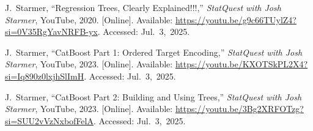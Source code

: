 \documentclass[12pt,oneside]{report}
\begin{document}
\begin{enumerate}[label={[\arabic*]}]

\item J.~Starmer, ``Regression Trees, Clearly Explained!!!,'' \textit{StatQuest with Josh Starmer}, YouTube, 2020. [Online]. Available: \url{https://youtu.be/g9c66TUylZ4?si=0V35RgYavNRFB-yx}. Accessed: Jul.~3,~2025.

\item J.~Starmer, ``CatBoost Part 1: Ordered Target Encoding,'' \textit{StatQuest with Josh Starmer}, YouTube, 2023. [Online]. Available: \url{https://youtu.be/KXOTSkPL2X4?si=Iq890z0lxjhSlImH}. Accessed: Jul.~3,~2025.

\item J.~Starmer, ``CatBoost Part 2: Building and Using Trees,'' \textit{StatQuest with Josh Starmer}, YouTube, 2023. [Online]. Available: \url{https://youtu.be/3Bg2XRFOTzg?si=SUU2vVzNxbofFelA}. Accessed: Jul.~3,~2025.

\end{enumerate}
\end{document}
